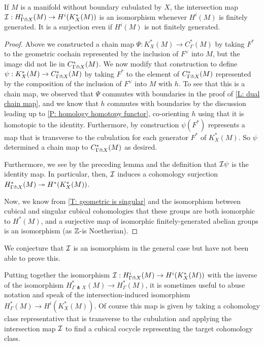 \begin{theorem}\label{T: intersection qi}
If $M$ is a manifold without boundary cubulated by $X$, the intersection map $\mathcal{I}: H^i_{\Gamma\pitchfork X}(M)\to H^i(K_X^*(M))$ is an isomorphism whenever $H^i(M)$ is finitely generated. It is a surjection even if $H^i(M)$ is not finitely generated. 
\end{theorem}
\begin{proof}
Above we constructed a chain map $\Psi:K_X^*(M)\to C_\Gamma^*(M)$ by taking $F^*$ to the geometric cochain represented by the inclusion of $F^\vee$ into $M$, but the image did not lie in $C^*_{\Gamma\pitchfork X}(M)$. We now modify that construction to define $\psi:K_X^*(M)\to C_{\Gamma\pitchfork X}^*(M)$ by taking $F^*$ to the element of $C^*_{\Gamma\pitchfork X}(M)$ represented by the composition of the inclusion of $F^\vee$ into $M$ with $h$. To see that this is a chain map, we observed that $\Psi$ commutes with boundaries in the proof of \cref{L: dual chain map}, and we know that $h$ commutes with boundaries by the discussion leading up to \cref{P: homology homotopy functor}, co-orienting $h$ using that it is homotopic to the identity. Furthermore, by construction $\psi(F^*)$ represents a map that is transverse to the cubulation for each generator $F^*$ of $K_X^*(M)$. So $\psi$ determined a chain map to $C_{\Gamma\pitchfork X}^*(M)$ as desired.  

 Furthermore, we see by the preceding lemma and the definition that $\mathcal{I}\psi$ is the identity map. In particular, then, $\mathcal{I}$ induces a cohomology surjection  $H^*_{\Gamma\pitchfork X}(M)\twoheadrightarrow H^*(K_X^*(M))$.

Now, we know from \cref{T: geometric is singular} and the isomorphism between cubical and singular cubical cohomologies that these groups are both isomorphic to $H^*(M)$, and a surjective map of isomorphic finitely-generated abelian groups is an isomorphism (as $\mathbb{Z}$-is Noetherian).
\end{proof}

We conjecture that $\mathcal{I}$ is an isomorphism in the general case but have not been able to prove this.


\begin{remark}\label{R: intersection map extension}
Putting together the isomorphism  $\mathcal{I}: H^i_{\Gamma\pitchfork X}(M)\to H^i(K_X^*(M))$ with the inverse of the isomorphism $H^*_{\Gamma \pitchfork X}(M)\to  H^*_\Gamma(M)$, it is sometimes useful to abuse notation and speak of the intersection-induced isomorphism 
 $H^*_\Gamma(M)\to H^i(K_X^*(M))$. Of course this map is given by taking a cohomology class representative that is transverse to the cubulation and applying the intersection map $\mathcal{I}$ to find a cubical cocycle representing the target cohomology class. 
\end{remark}




